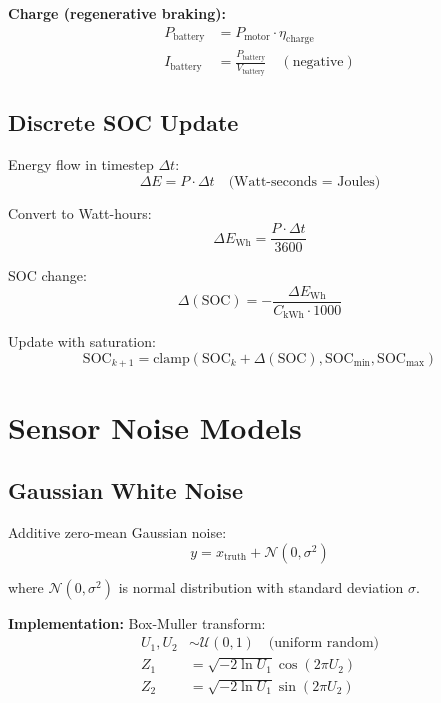 \documentclass[11pt,a4paper]{article}
\begin{document}
\textbf{Charge (regenerative braking):}
\begin{align}
P_{\text{battery}} &= P_{\text{motor}} \cdot \eta_{\text{charge}} \\
I_{\text{battery}} &= \frac{P_{\text{battery}}}{V_{\text{battery}}} \quad (\text{negative})
\end{align}

\subsection{Discrete SOC Update}

Energy flow in timestep $\Delta t$:
\begin{equation}
\Delta E = P \cdot \Delta t \quad \text{(Watt-seconds = Joules)}
\end{equation}

Convert to Watt-hours:
\begin{equation}
\Delta E_{\text{Wh}} = \frac{P \cdot \Delta t}{3600}
\end{equation}

SOC change:
\begin{equation}
\Delta(\text{SOC}) = -\frac{\Delta E_{\text{Wh}}}{C_{\text{kWh}} \cdot 1000}
\end{equation}

Update with saturation:
\begin{equation}
\text{SOC}_{k+1} = \text{clamp}(\text{SOC}_k + \Delta(\text{SOC}), \text{SOC}_{\min}, \text{SOC}_{\max})
\end{equation}

\section{Sensor Noise Models}

\subsection{Gaussian White Noise}

Additive zero-mean Gaussian noise:
\begin{equation}
y = x_{\text{truth}} + \mathcal{N}(0, \sigma^2)
\end{equation}

where $\mathcal{N}(0, \sigma^2)$ is normal distribution with standard deviation $\sigma$.

\textbf{Implementation:} Box-Muller transform:
\begin{align}
U_1, U_2 &\sim \mathcal{U}(0, 1) \quad \text{(uniform random)} \\
Z_1 &= \sqrt{-2 \ln U_1} \cos(2\pi U_2) \\
Z_2 &= \sqrt{-2 \ln U_1} \sin(2\pi U_2)
\end{align}
\end{document}
